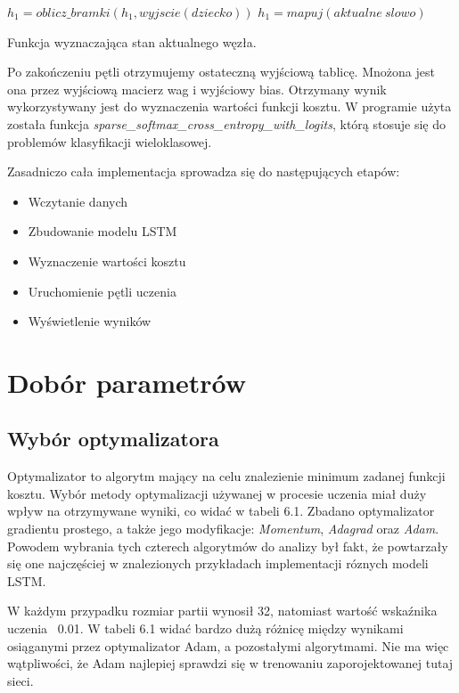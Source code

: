 \begin{listing}[]
\begin{algorithmic}
        \STATE $h_1 = oblicz\_bramki(h_1, wyjscie(dziecko))$
\ELSE
        \STATE $h_1 = mapuj(aktualne\ slowo)$
        \ENDIF
\ENDFOR
\end{algorithmic}
\caption{Funkcja wyznaczająca stan aktualnego węzła.}
\end{listing}

Po zakończeniu pętli otrzymujemy ostateczną wyjściową tablicę. Mnożona jest ona przez wyjściową macierz wag i wyjściowy bias. Otrzymany wynik wykorzystywany jest do wyznaczenia wartości funkcji kosztu. W programie użyta została funkcja \textit{sparse\_softmax\_cross\_entropy\_with\_logits}, którą stosuje się do problemów klasyfikacji wieloklasowej. 

Zasadniczo cała implementacja sprowadza się do następujących etapów:
\begin{itemize}
  \item Wczytanie danych
  \item Zbudowanie modelu LSTM
  \item Wyznaczenie wartości kosztu
  \item Uruchomienie pętli uczenia
  \item Wyświetlenie wyników
 \end{itemize}


\section{Dobór parametrów}
\label{cha:parametry}

\subsection{Wybór optymalizatora}
Optymalizator to algorytm mający na celu znalezienie minimum zadanej funkcji kosztu. Wybór metody optymalizacji używanej w procesie uczenia miał duży wpływ na otrzymywane wyniki, co widać w tabeli 6.1. Zbadano optymalizator gradientu prostego, a także jego modyfikacje: \textit{Momentum}, \textit{Adagrad} oraz \textit{Adam}. Powodem wybrania tych czterech algorytmów do analizy był fakt, że powtarzały się one najczęściej w znalezionych przykładach implementacji róznych modeli LSTM. 

W każdym przypadku rozmiar partii wynosił 32, natomiast wartość wskaźnika uczenia \textendash \ 0.01. W tabeli 6.1 widać bardzo dużą różnicę między wynikami osiąganymi przez optymalizator Adam, a pozostałymi algorytmami. Nie ma więc wątpliwości, że Adam najlepiej sprawdzi się w trenowaniu zaporojektowanej tutaj sieci.

